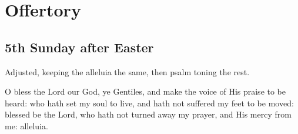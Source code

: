 \documentclass[12pt,a4paper]{article}
\begin{document}
\autocompilegabc

\section{Offertory}

\subsection{5th Sunday after Easter}

Adjusted, keeping the alleluia the same,
then psalm toning the rest.

\bigskip


\bigskip

O bless the Lord our God, ye Gentiles, and make the voice of His praise to be heard: who hath set my soul to live, and hath not suffered my feet to be moved: blessed be the Lord, who hath not turned away my prayer, and His mercy from me: alleluia.
\end{document}
